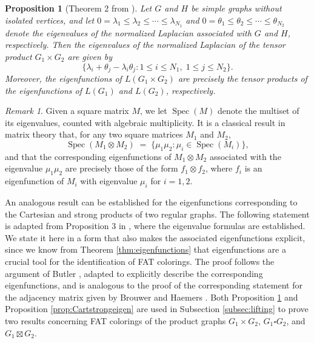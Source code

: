 \documentclass{article}
\DeclareMathOperator{\Spec}{\text{Spec}}
\theoremstyle{plain}
\newtheorem{proposition}[theorem]{Proposition}
\theoremstyle{definition}
\theoremstyle{remark}
\newtheorem{remark}[theorem]{Remark}
\begin{document}
\begin{proposition}[Theorem 2 from \cite{butler2016algebraic}]\label{prop:tensorspec}
    Let $G$ and $H$ be simple graphs without isolated vertices, and let $0=\lambda_1\leq \lambda_2\leq\cdots\leq\lambda_{N_1}$ and $0=\theta_1\leq\theta_2\leq\cdots\leq\theta_{N_2}$ denote the eigenvalues of the normalized Laplacian associated with $G$ and $H$, respectively. Then the eigenvalues of the normalized Laplacian of the tensor product $G_1\times G_2$ are given by
    \begin{equation*}
        \bigl\{\lambda_i+\theta_j-\lambda_i\theta_j \colon 1\leq i\leq N_1,\; 1\leq j\leq N_2\bigr\}.
    \end{equation*}
    Moreover, the eigenfunctions of $L(G_1\times G_2)$ are precisely the tensor products of the eigenfunctions of $L(G_1)$ and $L(G_2)$, respectively.
\end{proposition}

\begin{remark}\label{rmk:tensor}
Given a square matrix $M$, we let $\Spec(M)$ denote the multiset of its eigenvalues, counted with algebraic multiplicity. It is a classical result in matrix theory that, for any two square matrices $M_1$ and $M_2$,
    \[
    \Spec(M_1\otimes M_2) \;=\; \bigl\{\mu_1\mu_2 \colon \mu_i\in \Spec(M_i)\bigr\},
    \]
    and that the corresponding eigenfunctions of $M_1\otimes M_2$ associated with the eigenvalue $\mu_1\mu_2$ are precisely those of the form $f_1\otimes f_2$, where $f_i$ is an eigenfunction of $M_i$ with eigenvalue $\mu_i$ for $i=1,2$.
\end{remark}    

An analogous result can be established for the eigenfunctions corresponding to the Cartesian and strong products of two regular graphs. The following statement is adapted from Proposition 3 in \cite{butler2016algebraic}, where the eigenvalue formulas are established. We state it here in a form that also makes the associated eigenfunctions explicit, since we know from Theorem \ref{thm:eigenfunctions} that eigenfunctions are a crucial tool for the identification of FAT colorings. The proof follows the argument of Butler \cite{butler2016algebraic}, adapted to explicitly describe the corresponding eigenfunctions, and is analogous to the proof of the corresponding statement for the adjacency matrix given by Brouwer and Haemers \cite{BrouwerHaemers2012}. Both Proposition \ref{prop:tensorspec} and Proposition \ref{prop:Cartstrongeigen} are used in Subsection \ref{subsec:lifting} to prove two results concerning FAT colorings of the product graphs $G_1\times G_2$, $G_1\square G_2$, and $G_1\boxtimes G_2$.
\end{document}
